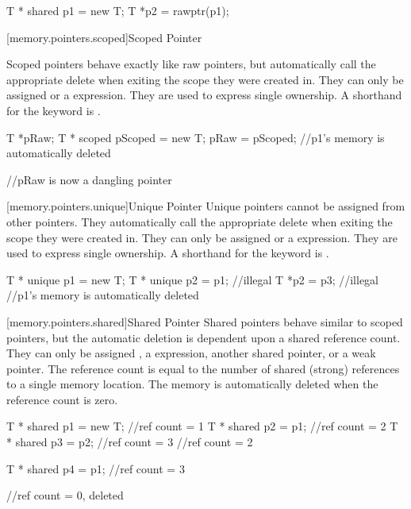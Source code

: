 \begin{codeblock}

T * shared p1 = new T;
T *p2 = rawptr(p1);

\end{codeblock}


[memory.pointers.scoped]{Scoped Pointer}

Scoped pointers behave exactly like raw pointers, but automatically call the appropriate delete when exiting the scope they were created in. They can only be assigned  or a  expression. They are used to express single ownership. A shorthand for the  keyword is \tcode{!}.

\begin{codeblock}

T *pRaw;
{
	T * scoped pScoped = new T;
	pRaw = pScoped;
} //p1's memory is automatically deleted

//pRaw is now a dangling pointer

\end{codeblock}

[memory.pointers.unique]{Unique Pointer}
Unique pointers cannot be assigned from other pointers. They automatically call the appropriate delete when exiting the scope they were created in. They can only be assigned  or a  expression. They are used to express single ownership. A shorthand for the  keyword is \tcode{\^}.


\begin{codeblock}
{
	T * unique p1 = new T;
	T * unique p2 = p1; //illegal
	T *p2 = p3; //illegal
} //p1's memory is automatically deleted

\end{codeblock}

[memory.pointers.shared]{Shared Pointer}
Shared pointers behave similar to scoped pointers, but the automatic deletion is dependent upon a shared reference count. They can only be assigned , a  expression, another shared pointer, or a weak pointer. The reference count is equal to the number of shared (strong) references to a single memory location. The memory is automatically deleted when the reference count is zero.

\begin{codeblock}

{
	T * shared p1 = new T;	//ref count = 1
	T * shared p2 = p1;		//ref count = 2
	{
		T * shared p3 = p2;	//ref count = 3
	} //ref count = 2

	T * shared p4 = p1;	//ref count = 3
} //ref count = 0, deleted

\end{codeblock}

